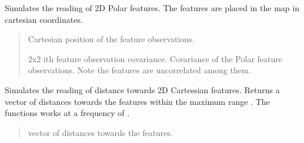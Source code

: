 \documentclass[letterpaper,10pt,english]{sphinxmanual}
\begin{document}
\begin{fulllineitems}
\begin{fulllineitems}
\begin{quote}
\begin{description}
\begin{description}
\end{description}


\end{description}\end{quote}

\end{fulllineitems}


\begin{fulllineitems}
\label{\detokenize{robot_simulation:DifferentialDriveSimulatedRobot.DifferentialDriveSimulatedRobot.ReadPolar2DFeature}}
\pysigstartsignatures
{}
\pysigstopsignatures
\sphinxAtStartPar
Simulates the reading of 2D Polar features. The features are placed in the map in cartesian coordinates.
\begin{quote}\begin{description}
\sphinxAtStartPar
\begin{description}
\sphinxAtStartPar
Cartesian position of the feature observations.

\sphinxAtStartPar
2x2 i\sphinxhyphen{}th feature observation covariance.
Covariance of the Polar feature observations. Note the features are uncorrelated among them.

\end{description}


\end{description}\end{quote}

\end{fulllineitems}


\begin{fulllineitems}
\label{\detokenize{robot_simulation:DifferentialDriveSimulatedRobot.DifferentialDriveSimulatedRobot.ReadRanges}}
\pysigstartsignatures
{}
\pysigstopsignatures
\sphinxAtStartPar
Simulates the reading of distance towards 2D Cartessian features. Returns a vector of distances towards the features within the maximum range .
The functions works at a frequency of .
\begin{quote}\begin{description}
\sphinxAtStartPar
vector of distances towards the features.


\end{description}
\end{quote}
\end{fulllineitems}
\end{fulllineitems}
\end{document}
